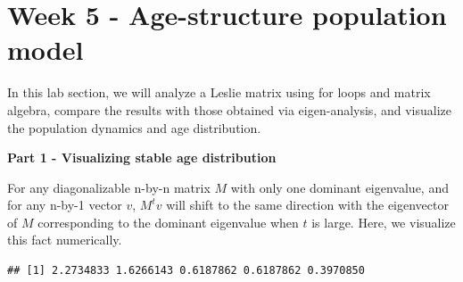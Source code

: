 \documentclass[
]{book}
\newenvironment{Shaded}{\begin{snugshade}}{\end{snugshade}}
\newcommand{\CommentTok}[1]{\textcolor[rgb]{0.56,0.35,0.01}{\textit{#1}}}
\newcommand{\DataTypeTok}[1]{\textcolor[rgb]{0.13,0.29,0.53}{#1}}
\newcommand{\DecValTok}[1]{\textcolor[rgb]{0.00,0.00,0.81}{#1}}
\newcommand{\KeywordTok}[1]{\textcolor[rgb]{0.13,0.29,0.53}{\textbf{#1}}}
\newcommand{\NormalTok}[1]{#1}
\newcommand{\OperatorTok}[1]{\textcolor[rgb]{0.81,0.36,0.00}{\textbf{#1}}}
\newcommand{\StringTok}[1]{\textcolor[rgb]{0.31,0.60,0.02}{#1}}
\begin{document}
\hypertarget{week-5---age-structure-population-model}{%
\chapter*{Week 5 - Age-structure population model}\label{week-5---age-structure-population-model}}

In this lab section, we will analyze a Leslie matrix using for loops and matrix algebra, compare the results with those obtained via eigen-analysis, and visualize the population dynamics and age distribution.

\textbf{Part 1 - Visualizing stable age distribution}

For any diagonalizable n-by-n matrix \(M\) with only one dominant eigenvalue, and for any n-by-1 vector \(v\), \(M^tv\) will shift to the same direction with the eigenvector of \(M\) corresponding to the dominant eigenvalue when \(t\) is large. Here, we visualize this fact numerically.

\begin{Shaded}
\end{Shaded}

\begin{verbatim}
## [1] 2.2734833 1.6266143 0.6187862 0.6187862 0.3970850
\end{verbatim}
\end{document}
